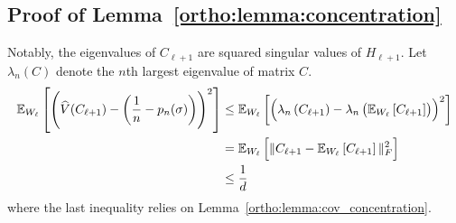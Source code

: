  \subsection*{Proof of Lemma~\ref{ortho:lemma:concentration}}
 Notably, the eigenvalues of $C_{\ell+1}$ are squared singular values of $H_{\ell+1}$. Let $\lambda_n(C)$ denote the $n$th largest eigenvalue of matrix $C$. 
 \begin{align*}
     \mathbb{E}_{W_{\ell}} \left[ \left( \widehat{V}(C_{\ell+1}) - \left(\frac{1}{n} - p_n(\sigma)\right) \right)^2 \right] & \leq \mathbb{E}_{W_{\ell}} \left[ \left(\lambda_n\left(C_{\ell+1}\right) - \lambda_n\left(\mathbb{E}_{W_{\ell}} \left[ C_{\ell+1} \right]\right) \right)^2\right] \\ 
     & = \mathbb{E}_{W_\ell} \left[ \| C_{\ell+1} - \mathbb{E}_{W_{\ell}} \left[ C_{\ell+1} \right] \|_F^2  \right] \\ 
     & \leq \frac{1}{d}
 \end{align*}
 where the last inequality relies on Lemma~\ref{ortho:lemma:cov_concentration}. 
